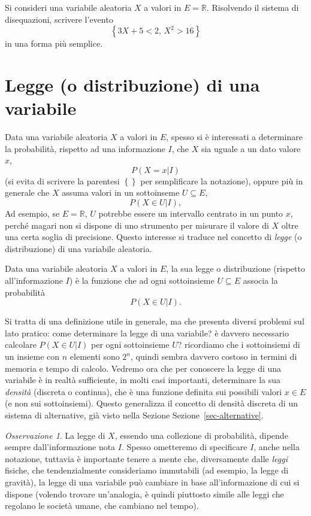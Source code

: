\documentclass[
  italian,
  letterpaper,
]{book}
\newcommand{\cur}[1]{\left\{ #1 \right\}}
\newcommand{\R}{\mathbb{R}}
\theoremstyle{definition}
\theoremstyle{remark}
\newtheorem*{remark}{Osservazione}
\begin{document}
Si consideri una variabile aleatoria \(X\) a valori in \(E = \R\).
Risolvendo il sistema di disequazioni, scrivere l'evento
\[ \cur{ 3 X + 5 < 2, \, X^2 > 16 } \] in una forma più semplice.

\section{Legge (o distribuzione) di una variabile}\label{sec-legge}

Data una variabile aleatoria \(X\) a valori in \(E\), spesso si è
interessati a determinare la probabilità, rispetto ad una informazione
\(I\), che \(X\) sia uguale a un dato valore \(x\), \[ P(X  =x | I) \]
(si evita di scrivere la parentesi \(\cur{}\) per semplificare la
notazione), oppure più in generale che \(X\) assuma valori in un
sottoinseme \(U \subseteq E\), \[ P(X \in U |I),\] Ad esempio, se
\(E = \R\), \(U\) potrebbe essere un intervallo centrato in un punto
\(x\), perché magari non si dispone di uno strumento per misurare il
valore di \(X\) oltre una certa soglia di precisione. Questo interesse
si traduce nel concetto di \emph{legge} (o distribuzione) di una
variabile aleatoria.

Data una variabile aleatoria \(X\) a valori in \(E\), la sua legge o
distribuzione (rispetto all'informazione \(I\)) è la funzione che ad
ogni sottoinsieme \(U \subseteq E\) associa la probabilità
\[ P(X \in U | I).\]

Si tratta di una definizione utile in generale, ma che presenta diversi
problemi sul lato pratico: come determinare la legge di una variabile? è
davvero necessario calcolare \(P(X\in U|I)\) per ogni sottoinsieme
\(U\)? ricordiamo che i sottoinsiemi di un insieme con \(n\) elementi
sono \(2^n\), quindi sembra davvero costoso in termini di memoria e
tempo di calcolo. Vedremo ora che per conoscere la legge di una
variabile è in realtà sufficiente, in molti casi importanti, determinare
la sua \emph{densità} (discreta o continua), che è una funzione definita
sui possibili valori \(x \in E\) (e non sui sottoinsiemi). Questo
generalizza il concetto di densità discreta di un sistema di
alternative, già visto nella Sezione Sezione~\ref{sec-alternative}.

\begin{remark}
La legge di \(X\), essendo una collezione di probabilità, dipende sempre
dall'informazione nota \(I\). Spesso ometteremo di specificare \(I\),
anche nella notazione, tuttavia è importante tenere a mente che,
diversamente dalle \emph{leggi} fisiche, che tendenzialmente
consideriamo immutabili (ad esempio, la legge di gravità), la legge di
una variabile può cambiare in base all'informazione di cui si dispone
(volendo trovare un'analogia, è quindi piuttosto simile alle leggi che
regolano le società umane, che cambiano nel tempo).
\end{remark}
\end{document}
